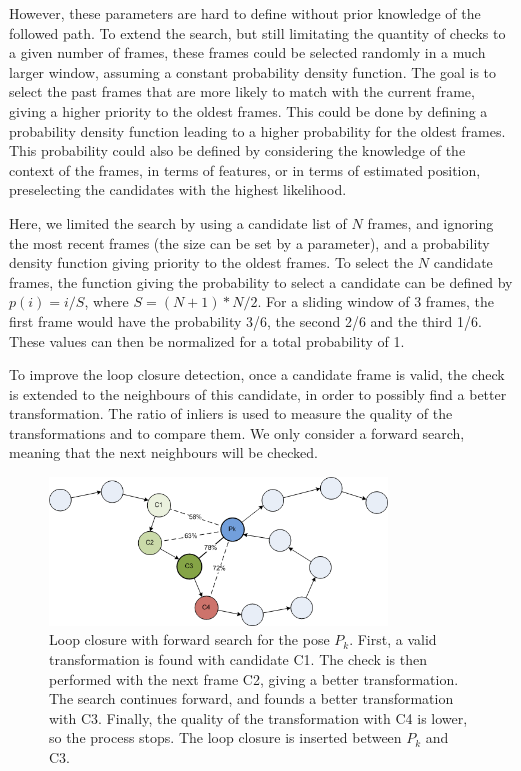 However, these parameters are hard to define without prior knowledge of the followed path. To extend the search, but still limitating the quantity of checks to a given number of frames, these frames could be selected randomly in a much larger window, assuming a constant probability density function. The goal is to select the past frames that are more likely to match with the current frame, giving a higher priority to the oldest frames. This could be done by defining a probability density function leading to a higher probability for the oldest frames. This probability could also be defined by considering the knowledge of the context of the frames, in terms of features, or in terms of estimated position, preselecting the candidates with the highest likelihood.

Here, we limited the search by using a candidate list of $N$ frames, and ignoring the most recent frames (the size can be set by a parameter), and a probability density function giving priority to the oldest frames. To select the $N$ candidate frames, the function giving the probability to select a candidate can be defined by $p(i) = i/S$, where $S=(N+1)*N/2$. For a sliding window of 3 frames, the first frame would have the probability 3/6, the second 2/6 and the third 1/6. These values can then be normalized for a total probability of 1.

To improve the loop closure detection, once a candidate frame is valid, the check is extended to the neighbours of this candidate, in order to possibly find a better transformation. The ratio of inliers is used to measure the quality of the transformations and to compare them. We only consider a forward search, meaning that the next neighbours will be checked.

\begin{figure}[H]
\centering
 \includegraphics[width=0.8\textwidth]{figures/graph_lc_candidate_2}
\caption{Loop closure with forward search for the pose $P_k$. First, a valid transformation is found with candidate C1. The check is then performed with the next frame C2, giving a better transformation. The search continues forward, and founds a better transformation with C3. Finally, the quality of the transformation with C4 is lower, so the process stops. The loop closure is inserted between $P_k$ and C3.}
\end{figure}

